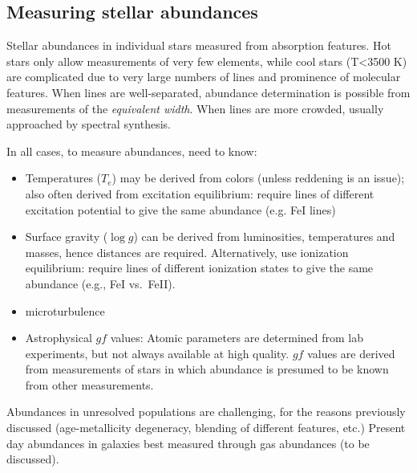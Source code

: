 \documentclass{article}
\begin{document}
\subsection{Measuring stellar abundances}
Stellar abundances in individual stars measured from absorption features.
Hot stars only allow measurements of very few elements, while cool stars
(T\textless3500 K) are complicated due to very large numbers of lines and
prominence of molecular features. When lines are well-separated, abundance
determination is possible from measurements of the \textit{equivalent width}.
When lines are more crowded, usually approached by spectral synthesis.

In all cases, to measure abundances, need to know:
\begin{description}[
            labelindent=0in,
            labelwidth=2in
            style=multiline,
            itemsep=2ex,
        ]
    \item [atmospheric parameters]
        \begin{itemize}
            \item Temperatures ($T_{e}$) may be derived from colors
                (unless reddening is an issue); also often derived from
                excitation equilibrium: require lines of different
                excitation potential to give the same abundance (e.g. FeI lines)
            \item Surface gravity ($\log{g}$) can be derived from luminosities,
                temperatures and masses, hence distances are required.
                Alternatively, use ionization equilibrium: require lines
                of different ionization states to give the same abundance
                (e.g., FeI vs.\ FeII).
            \item microturbulence
        \end{itemize}
    \item [atomic parameters]
        \begin{itemize}
            \item Astrophysical $gf$ values: Atomic parameters are determined
                from lab experiments, but not always available at high quality.
                $gf$ values are derived from measurements of stars in which
                abundance is presumed to be known from other measurements.
        \end{itemize}
\end{description}
Abundances in unresolved populations are challenging, for the reasons
previously discussed (age-metallicity degeneracy, blending of different
features, etc.) Present day abundances in galaxies best measured through
gas abundances (to be discussed).
\end{document}
